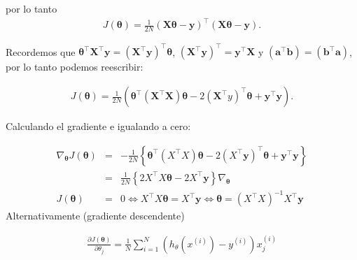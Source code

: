 \documentclass[12pt]{article}
\begin{document}
por lo tanto
\begin{eqnarray*}
J(\mathbf{\theta}) = \frac{1}{2N} (\mathbf{X} \mathbf{\theta} - \mathbf{y})^{\top} (\mathbf{X} \mathbf{\theta} - \mathbf{y}).
\end{eqnarray*}



Recordemos que $\mathbf{\theta}^{\top} \mathbf{X}^{\top} \mathbf{y} = (\mathbf{X}^{\top} \mathbf{y})^{\top} \mathbf{\theta}$, $(\mathbf{X}^{\top} \mathbf{y})^{\top} = \mathbf{y}^{\top} \mathbf{X}$ y $(\mathbf{a}^{\top} \mathbf{b}) = (\mathbf{b}^{\top} \mathbf{a})$, por lo tanto podemos reescribir:

\begin{eqnarray}
J(\mathbf{\theta}) = \frac{1}{2N}\left( \mathbf{\theta}^{\top}\left(\mathbf{X}^{\top}\mathbf{X}\right)\mathbf{\theta}- 2\left(\mathbf{X}^{\top}y\right)^{\top}\mathbf{\theta}+ \mathbf{y}^{\top}\mathbf{y}\right).
\end{eqnarray}

Calculando el gradiente e igualando a cero:

\begin{eqnarray}
\nabla_{\boldsymbol{\theta}} J(\boldsymbol{\theta})&=& -\frac{1}{2N} \left\{ \boldsymbol{\theta}^{\top} (X^{\top}X)\boldsymbol{\theta} - 2(X^{\top} \mathbf{y})^{\top} \boldsymbol{\theta} + \mathbf{y}^{\top} \mathbf{y} \right\}\\
&=& \frac{1}{2N} \left\{ 2 X^{\top} X \boldsymbol{\theta} - 2 X^{\top} \mathbf{y} \right\}
\nabla_{\boldsymbol{\theta}}\\
 J(\boldsymbol{\theta})&=& 0 \Leftrightarrow X^{\top} X \boldsymbol{\theta} = X^{\top} \mathbf{y} \Leftrightarrow \boldsymbol{\theta}= (X^{\top} X)^{-1} X^{\top} \mathbf{y}
\end{eqnarray}
Alternativamente (gradiente descendente)

\begin{eqnarray}
\frac{\partial J(\boldsymbol{\theta})}{\partial \theta_j} = \frac{1}{N} \sum_{i=1}^{N} \left( h_{\theta}(x^{(i)}) - y^{(i)} \right) x_j^{(i)}
\end{eqnarray}
\end{document}
